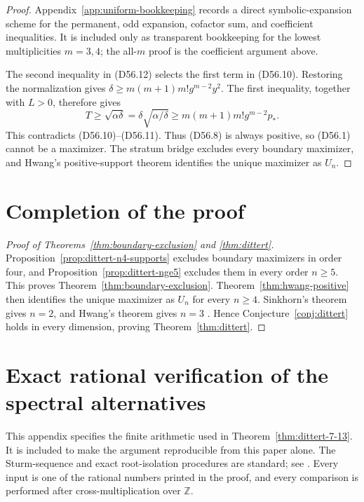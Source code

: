 \documentclass[11pt]{amsart}
\theoremstyle{definition}
\theoremstyle{remark}
\begin{document}
\begin{proof}
Appendix~\ref{app:uniform-bookkeeping} records a direct symbolic-expansion
scheme for the permanent, odd expansion, cofactor sum, and coefficient
inequalities.  It is included only as transparent bookkeeping for the
lowest multiplicities \(m=3,4\); the all-\(m\) proof is the coefficient
argument above.

The second inequality in (D56.12) selects the first term in (D56.10).
Restoring the normalization gives
\(\delta\geq m(m+1)m!g^{m-2}y^2\). The first inequality, together with
\(L>0\), therefore gives
\[
T\geq\sqrt{\alpha\delta}
=\delta\sqrt{\alpha/\delta}
\geq m(m+1)m!g^{m-2}p_*.
\]
This contradicts (D56.10)--(D56.11). Thus (D56.8) is always positive, so
(D56.1) cannot be a maximizer. The stratum bridge excludes every boundary
maximizer, and Hwang's positive-support theorem identifies the unique
maximizer as \(U_n\).
\end{proof}

\section{Completion of the proof}\label{sec:completion}

\begin{proof}[Proof of Theorems~\ref{thm:boundary-exclusion} and
\ref{thm:dittert}]
Proposition~\ref{prop:dittert-n4-supports} excludes boundary maximizers in
order four, and Proposition~\ref{prop:dittert-nge5} excludes them in every
order \(n\geq5\).  This proves Theorem~\ref{thm:boundary-exclusion}.
Theorem~\ref{thm:hwang-positive} then identifies the unique maximizer as
\(U_n\) for every \(n\geq4\).  Sinkhorn's theorem gives \(n=2\), and
Hwang's theorem gives \(n=3\) \cite{Sinkhorn,Hwang87}.  Hence
Conjecture~\ref{conj:dittert} holds in every dimension, proving
Theorem~\ref{thm:dittert}.
\end{proof}

\appendix

\section{Exact rational verification of the spectral alternatives}
\label{app:spectral-certificate}

This appendix specifies the finite arithmetic used in
Theorem~\ref{thm:dittert-7-13}.  It is included to make the argument
reproducible from this paper alone.  The Sturm-sequence and exact
root-isolation procedures are standard; see \cite{BasuPollackRoy}.  Every input is one of the rational
numbers printed in the proof, and every comparison is performed after
cross-multiplication over \(\mathbb Z\).
\end{document}
